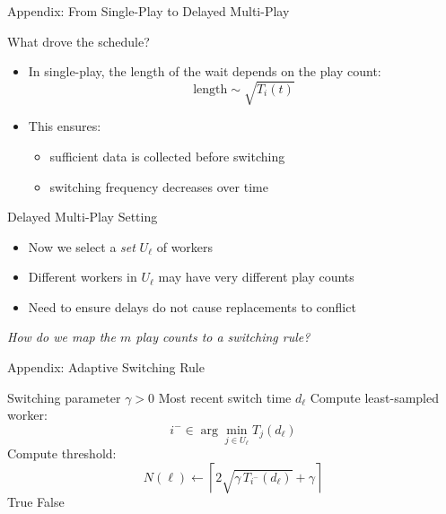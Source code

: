 \documentclass[10pt,aspectratio=169]{beamer}
\begin{document}
\begin{frame}{Appendix: From Single-Play to Delayed Multi-Play}
    \begin{block}{What drove the schedule?}
    \begin{itemize}
        \item In single-play, the length of the wait depends on the play count:
        \[
        \text{length} \sim \sqrt{T_i(t)}
        \]
        \item This ensures:
        \begin{itemize}
            \item sufficient data is collected before switching
            \item switching frequency decreases over time
        \end{itemize}
    \end{itemize}
    \end{block}
    
    \vspace{0.5em}
    
    \begin{block}{Delayed Multi-Play Setting}
    \begin{itemize}
        \item Now we select a \emph{set} \(U_\ell\) of workers
        \item Different workers in \(U_\ell\) may have very different play counts
        \item Need to ensure delays do not cause replacements to conflict
    \end{itemize}
    \end{block}
    
    \vspace{0.5em}
    
    \centering
    \emph{How do we map the \(m\) play counts to a switching rule?}
\end{frame}

\begin{frame}{Appendix: Adaptive Switching Rule}
\begin{algorithm}[H]
    \caption{TimeToReplace}
    \begin{algorithmic}[1]
        \REQUIRE Switching parameter \(\gamma>0\)
        \REQUIRE Most recent switch time \(d_\ell\)
        \STATE Compute least-sampled worker:
        \[
            i^- \in \arg\min_{j \in U_\ell} T_j(d_\ell)
        \]
        \STATE Compute threshold:
        \[
            N(\ell)\gets \left\lceil 2\sqrt{\gamma\, T_{i^-}(d_\ell)} + \gamma \right\rceil
        \]
            \RETURN True
        \ELSE
            \RETURN False
        \ENDIF
    \end{algorithmic}
\end{algorithm}
\end{frame}
\end{document}
